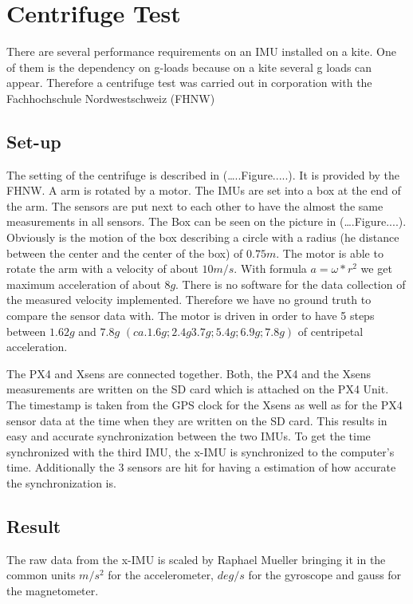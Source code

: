 \section{Centrifuge Test}
There are several performance requirements on an IMU installed on a kite. One of them is the dependency on g-loads because on a kite several g loads can appear. Therefore a centrifuge test was carried out in corporation with the Fachhochschule Nordwestschweiz (FHNW)
\subsection{Set-up}
The setting of the centrifuge is described in (…..Figure.....). It is provided by the FHNW. A arm is rotated by a motor. The IMUs are set into a box at the end of the arm. The sensors are put next to each other to have the almost the same measurements in all sensors. The Box can be seen on the picture in (….Figure....). Obviously is the motion of the box describing a circle with a radius (he distance between the center and the  center of the box) of $0.75 m$. The motor is able to rotate the arm with a velocity of about $10 m/s$. With formula $a=\omega*r^2$ we get maximum acceleration of about $8 g$. There is no software for the data collection of the measured velocity implemented. Therefore we have no ground truth to compare the sensor data with. The motor is driven in order to have 5 steps between $1.62 g$ and $7.8 g$ $(ca. 1.6 g; 2.4 g 3.7 g; 5.4 g; 6.9 g; 7.8 g)$ of centripetal acceleration.

The PX4 and Xsens are connected together. Both, the PX4 and the Xsens measurements are written on the SD card which is attached on the PX4 Unit. The timestamp is taken from the GPS clock for the Xsens as well as for the PX4 sensor data at the time when they are written on the SD card. This results in easy and accurate synchronization between the two IMUs. To get the time synchronized with the third IMU, the x-IMU is synchronized to the computer's time. Additionally the 3 sensors are hit for having a estimation of how accurate the synchronization is.
\subsection{Result}
The raw data from the x-IMU is scaled by Raphael Mueller bringing it in the common units $m/s^2$ for the accelerometer, $deg/s$ for the gyroscope and gauss for the magnetometer.

